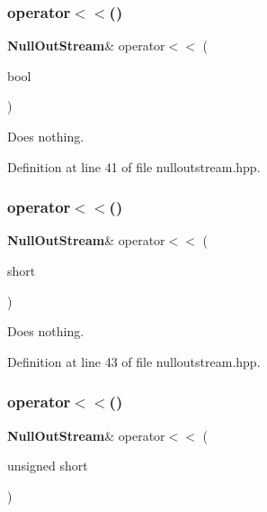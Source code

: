 \subsubsection{operator$<$$<$()\hspace{0.1cm}{\footnotesize\ttfamily [1/18]}}
{\footnotesize\ttfamily \textbf{ Null\+Out\+Stream}\& operator$<$$<$ (\begin{DoxyParamCaption}\item[{bool}]{ }\end{DoxyParamCaption})\hspace{0.3cm}{\ttfamily [inline]}}



Does nothing. 



Definition at line 41 of file nulloutstream.\+hpp.

\mbox{\label{classmlpack_1_1util_1_1NullOutStream_a30cf0d8b1a4df0876aecba083f618c0d}} 
\subsubsection{operator$<$$<$()\hspace{0.1cm}{\footnotesize\ttfamily [2/18]}}
{\footnotesize\ttfamily \textbf{ Null\+Out\+Stream}\& operator$<$$<$ (\begin{DoxyParamCaption}\item[{short}]{ }\end{DoxyParamCaption})\hspace{0.3cm}{\ttfamily [inline]}}



Does nothing. 



Definition at line 43 of file nulloutstream.\+hpp.

\mbox{\label{classmlpack_1_1util_1_1NullOutStream_a12bda6cf6bdebfcd287625336975a51f}} 
\subsubsection{operator$<$$<$()\hspace{0.1cm}{\footnotesize\ttfamily [3/18]}}
{\footnotesize\ttfamily \textbf{ Null\+Out\+Stream}\& operator$<$$<$ (\begin{DoxyParamCaption}\item[{unsigned}]{short }\end{DoxyParamCaption})\hspace{0.3cm}{\ttfamily [inline]}}



